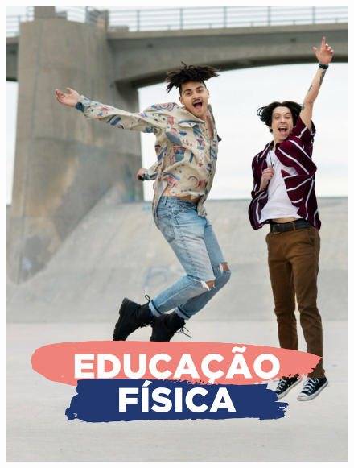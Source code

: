\begin{figure}[htpb]
\vspace*{-2.5cm}
\hspace*{-2.5cm}\includegraphics[height=\paperheight]{../separadores/separadorEF9A.png}
\end{figure}
\pagebreak

